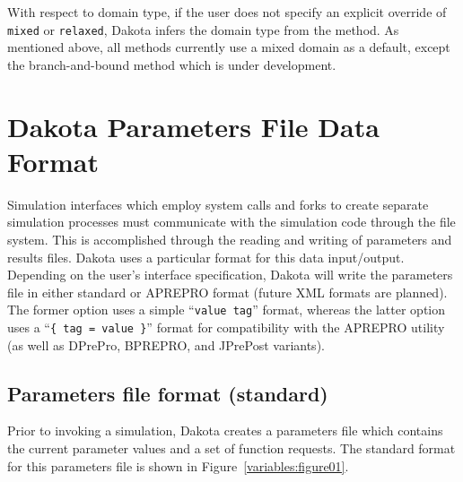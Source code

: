 With respect to domain type, if the user does not specify an 
explicit override of \texttt{mixed} or \texttt{relaxed}, Dakota infers
the domain type from the method.  As mentioned above, 
all methods currently use a mixed domain as a default, except 
the branch-and-bound method which is under development.
  
\section{Dakota Parameters File Data Format}\label{variables:parameters}

Simulation interfaces which employ system calls and forks to create
separate simulation processes must communicate with the simulation
code through the file system. This is accomplished through the reading
and writing of parameters and results files. Dakota uses a particular
format for this data input/output. Depending on the user's interface
specification, Dakota will write the parameters file in either
standard or APREPRO format (future XML formats are planned). The
former option uses a simple ``\texttt{value tag}'' format, whereas the
latter option uses a ``\texttt{\{ tag = value \}}'' format for
compatibility with the APREPRO utility~\cite{Sja92} (as well as
DPrePro, BPREPRO, and JPrePost variants).

\subsection{Parameters file format (standard)}\label{variables:parameters:standard}

Prior to invoking a simulation, Dakota creates a parameters file which
contains the current parameter values and a set of function requests.
The standard format for this parameters file is shown in
Figure~\ref{variables:figure01}.

